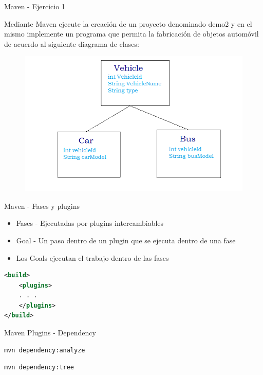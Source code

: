 \documentclass[aspectratio=169]{beamer}
\begin{document}
\begin{frame}{Maven - Ejercicio 1}

Mediante Maven ejecute la creación de un proyecto denominado demo2 y en el mismo implemente un programa que permita la fabricación de objetos automóvil de acuerdo al siguiente diagrama de clases:

\begin{figure}
	\centering
	\includegraphics[width=0.7\linewidth]{Images/carro}
\end{figure}

\end{frame}


\begin{frame}[fragile]{Maven - Fases y plugins}
\begin{itemize}
	\item Fases - Ejecutadas por plugins intercambiables
	\item Goal - Un paso dentro de un plugin que se ejecuta dentro de una fase
	\item Los Goals ejecutan el trabajo dentro de las fases
\end{itemize}

\begin{lstlisting}[language=xml]
<build>
    <plugins>
    . . .
    </plugins>
</build>
\end{lstlisting}

\end{frame}

\begin{frame}[fragile]{Maven Plugins - Dependency}

\begin{lstlisting}[language=bash]
mvn dependency:analyze
\end{lstlisting}

\begin{lstlisting}[language=bash]
mvn dependency:tree
\end{lstlisting}
\end{frame}
\end{document}
